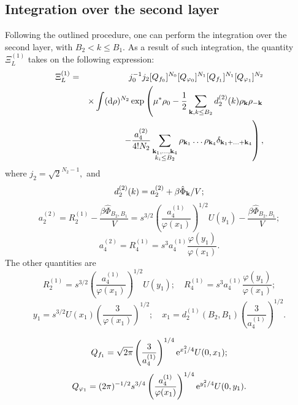 \subsection{Integration over the second layer}
Following the outlined procedure, one can perform the integration over the second layer, with $B_2 < k \le B_1.$ As a result of such integration, the quantity $\Xi_L^{(1)}$ takes on the following expression:
\begin{eqnarray}
	\Xi_L^{(1)} & = & j_0^{-1}j_2 [Q_{f_0}]^{N_0} [Q_{\varphi_0}]^{N_1} [Q_{f_1}]^{N_1} [Q_{\varphi_1}]^{N_2} 
	\\
	&& \times 
	\int ({\rm d} \rho)^{N_2} \exp
	\left(
	\mu^*\rho_0 - \frac{1}{2} \sum_{\vb k, k \leq B_2} d_2^{(2)}(k) \rho_{\vb k} \rho_{-\vb k}
	\right.
	\nonumber \\
	&& 
	\left.
	- \frac{a_4^{(2)}}{4!N_2} \sum_{\substack{\vb k_1, \dotsc, \vb k_4 \\ k_i \leq B_2}}
	\rho_{\vb k_1} \dotsc \rho_{\vb k_4} \delta_{\vb{k}_1 + \dotsc + \vb{k}_4}
	\right)
	\nonumber ,
\end{eqnarray}
where $j_2 = \sqrt{2}^{N_2 - 1},$ and
\begin{equation}
	\label{RR_2_1_d}
	d_2^{(2)}(k) = a_2^{(2)} + \beta\hat{\Phi}_{\vb k} / V;
\end{equation}
\begin{equation}
	\label{RR_2_1_a2}
	a_2^{(2)} = R_2^{(1)} - \frac{\beta\hat{\Phi}_{B_2, B_1}}{V} = s^{3/2} \left(\frac{a_4^{(1)}}{\varphi(x_1)}\right)^{1/2} U(y_1)
	- \frac{\beta\hat{\Phi}_{B_2, B_1}}{V};
\end{equation}
\begin{equation}
	\label{RR_2_1_a4}
	a_4^{(2)} = R_4^{(1)} = s^3 a_4^{(1)} \frac{\varphi(y_1)}{\varphi(x_1)}.
\end{equation}
The other quantities are
\begin{equation*}
	R_2^{(1)} = s^{3/2} \left(\frac{a_4^{(1)}}{\varphi(x_1)}\right)^{1/2} U(y_1); 
	\quad 
	R_4^{(1)} = s^3 a_4^{(1)} \frac{\varphi(y_1)}{\varphi(x_1)};
\end{equation*}
\begin{equation*}
	y_1 = s^{3/2} U(x_1) \left(\frac{3}{\varphi(x_1)}\right)^{1/2};
	\quad
	x_1 = d_2^{(1)}(B_2, B_1) \left(\frac{3}{a_4^{(1)}}\right)^{1/2}.
\end{equation*}

\begin{equation*}
	Q_{f_1} = \sqrt{2\pi}\left(\frac{3}{a_4^{(1)}}\right)^{1/4} {\rm e}^{x_1^2/4} U(0,x_1);
\end{equation*}
\begin{equation*}
	Q_{\varphi_1} = (2\pi)^{-1/2} s^{3/4} \left(\frac{a_4^{(1)}}{\varphi(x_1)}\right)^{1/4} {\rm e}^{y_1^2/4} U(0,y_1).
\end{equation*}

